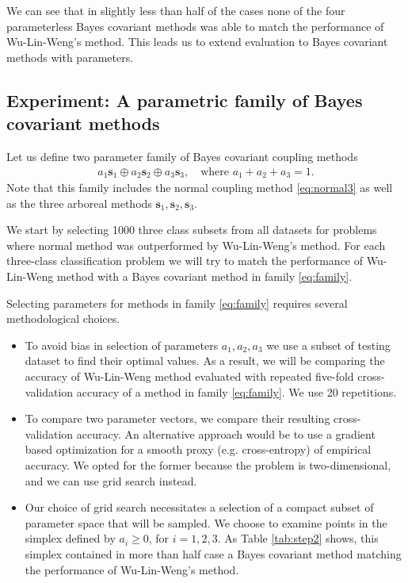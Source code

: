

We can see that in slightly less than half of the cases none of the four parameterless Bayes covariant methods was able to match the performance of Wu-Lin-Weng's method. This leads us to extend evaluation to Bayes covariant methods with parameters. 

\subsection{Experiment: A parametric family of Bayes covariant methods}

Let us define two parameter family of Bayes covariant coupling methods
\begin{align}
a_1 \boldsymbol{s}_1 \oplus a_2 \boldsymbol{s}_2 \oplus a_3 \boldsymbol{s}_3,\quad\textrm{where } a_1 + a_2 +a_3 = 1. \label{eq:family}
\end{align}
Note that this family includes the normal coupling method \eqref{eq:normal3} as well as the three arboreal methods $\boldsymbol{s}_1, \boldsymbol{s}_2, \boldsymbol{s}_3$.

We start by selecting 1000 three class subsets from all datasets for problems where normal method was outperformed by Wu-Lin-Weng's method. For each three-class classification problem we will try to match the performance of Wu-Lin-Weng method with a Bayes covariant method in family \eqref{eq:family}.

Selecting parameters for methods in family \eqref{eq:family} requires several methodological choices. 
\begin{itemize}
\item To avoid bias in selection of parameters $a_1, a_2, a_3$ we use a subset of testing dataset to find their optimal values. As a result, we will be comparing the accuracy of Wu-Lin-Weng method evaluated with repeated five-fold cross-validation accuracy of a method in family \eqref{eq:family}. We use 20 repetitions.
\item To compare two parameter vectors, we compare their resulting cross-validation accuracy. An alternative approach would be to use  a gradient based optimization for a smooth proxy (e.g. cross-entropy) of empirical accuracy. We opted for the former because the problem is two-dimensional, and we can use grid search instead.
\item Our choice of grid search necessitates a selection of a compact subset of parameter space that will be sampled. We choose to examine points in the simplex defined by  $a_i\geq 0$, for $i=1,2,3$. As Table \ref{tab:step2} shows, this simplex contained in more than half case a Bayes covariant method matching the performance of Wu-Lin-Weng's method.
\end{itemize}



